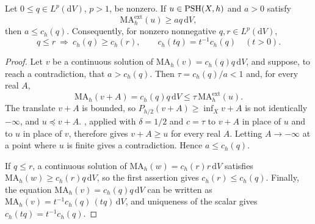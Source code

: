 \begin{lemma}\label{lem:bounded-normalizer-subsolution}\label{lem:smooth-normalizer-subsolution-bound}
Let $0\leq q\in L^p(\mathrm{d}V)$, $p>1$, be nonzero. If $u\in\mathrm{PSH}(X,h)$ and $a>0$ satisfy
\[
 \mathrm{MA}^{\mathrm{ext}}_h(u)\geq aq\,\mathrm{d}V,
\]
then $a\leq c_h(q)$. Consequently, for nonzero nonnegative $q,r\in L^p(\mathrm{d}V)$,
\[
 q\leq r\ \Longrightarrow\ c_h(q)\geq c_h(r),
 \qquad c_h(tq)=t^{-1}c_h(q)\quad(t>0).
\]
\end{lemma}
\begin{proof}
Let $v$ be a continuous solution of $\mathrm{MA}_h(v)=c_h(q)q\,\mathrm{d}V$, and suppose, to reach a contradiction, that $a>c_h(q)$. Then $\tau=c_h(q)/a<1$ and, for every real $A$,
\[
 \mathrm{MA}_h(v+A)=c_h(q)q\,\mathrm{d}V
       \leq\tau\,\mathrm{MA}^{\mathrm{ext}}_h(u).
\]
The translate $v+A$ is bounded, so $P_{h/2}(v+A)\geq\inf_Xv+A$ is not identically $-\infty$, and $u\preceq v+A$. , applied with $\delta=1/2$ and $c=\tau$ to $v+A$ in place of $u$ and to $u$ in place of $v$, therefore gives $v+A\geq u$ for every real $A$. Letting $A\to-\infty$ at a point where $u$ is finite gives a contradiction. Hence $a\leq c_h(q)$.

If $q\leq r$, a continuous solution of $\mathrm{MA}_h(w)=c_h(r)r\,\mathrm{d}V$ satisfies $\mathrm{MA}_h(w)\geq c_h(r)q\,\mathrm{d}V$, so the first assertion gives $c_h(r)\leq c_h(q)$. Finally, the equation $\mathrm{MA}_h(v)=c_h(q)q\,\mathrm{d}V$ can be written as $\mathrm{MA}_h(v)=t^{-1}c_h(q)\,(tq)\,\mathrm{d}V$, and uniqueness of the scalar gives $c_h(tq)=t^{-1}c_h(q)$.
\end{proof}

